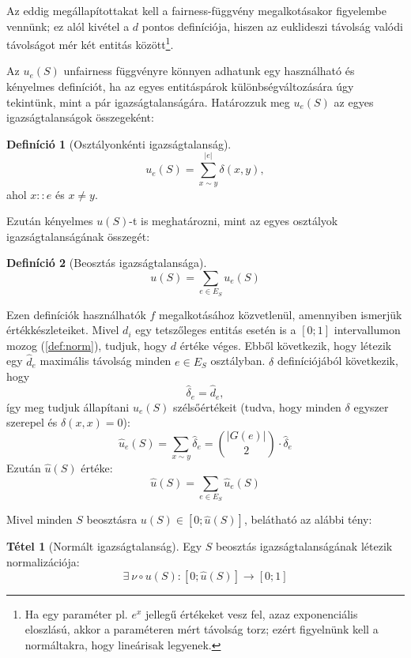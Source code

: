 \documentclass[twocolumn]{article}
\theoremstyle{definition}
\newtheorem{definition}{Definíció}[section]
\newtheorem{theorem}{Tétel}[section]
\begin{document}
    Az eddig megállapítottakat kell a fairness-függvény megalkotásakor figyelembe vennünk; ez alól kivétel a $d$ pontos definíciója, hiszen az euklideszi távolság valódi távolságot mér két entitás között\footnote{Ha egy paraméter pl. $e^x$ jellegű értékeket vesz fel, azaz exponenciális eloszlású, akkor a paraméteren mért távolság torz; ezért figyelnünk kell a normáltakra, hogy lineárisak legyenek.}.
    
    Az $u_e(S)$ unfairness függvényre könnyen adhatunk egy használható és kényelmes definíciót, ha az egyes entitáspárok különbségváltozására úgy tekintünk, mint a pár igazságtalanságára. Határozzuk meg $u_e(S)$ az egyes igazságtalanságok összegeként:
    \begin{definition}[Osztályonkénti igazságtalanság]
        \begin{equation}
            u_e(S) = \sum_{x \sim y}^{|e|} \delta(x, y),
        \end{equation}
        ahol $x::e$ és $x \neq y$.        
    \end{definition}

    
    Ezután kényelmes $u(S)$-t is meghatározni, mint az egyes osztályok igazságtalanságának összegét:
    \begin{definition}[Beosztás igazságtalansága]
        \begin{equation}
            u(S) = \sum_{e \in E_S} u_e(S)
        \end{equation}
    \end{definition}
    
    Ezen definíciók használhatók $f$ megalkotásához közvetlenül, amennyiben ismerjük értékkészleteiket. Mivel $d_i$ egy tetszőleges entitás esetén is a $[0;1]$ intervallumon mozog (\ref{def:norm}), tudjuk, hogy $d$ értéke véges. Ebből következik, hogy létezik egy $\hat{d}_e$ maximális távolság minden $e \in E_S$ osztályban. $\delta$ definíciójából következik, hogy $$\hat{\delta}_e = \hat{d}_e, $$
    így meg tudjuk állapítani $u_e(S)$ szélsőértékeit (tudva, hogy minden $\delta$ egyszer szerepel és $\delta(x, x) = 0$):
    \begin{equation}
        \hat{u}_e(S) = \sum_{x \sim y} \hat{\delta}_e = \binom{|G(e)|}{2} \cdot \hat{\delta}_e
    \end{equation}
    Ezután $\hat{u}(S)$ értéke:
    \begin{equation}
        \hat{u}(S) = \sum_{e \in E_S} \hat{u}_e(S)
    \end{equation}
    
    Mivel minden $S$ beosztásra $u(S) \in [0; \hat{u}(S)]$, belátható az alábbi tény:
    \begin{theorem}[Normált igazságtalanság]
        Egy $S$ beosztás igazságtalanságának létezik normalizációja:
        \begin{equation}
            \exists \ \nu \circ u(S): [0; \hat{u}(S)] \to [0; 1]
        \end{equation}
    \end{theorem}
    
\end{document}
